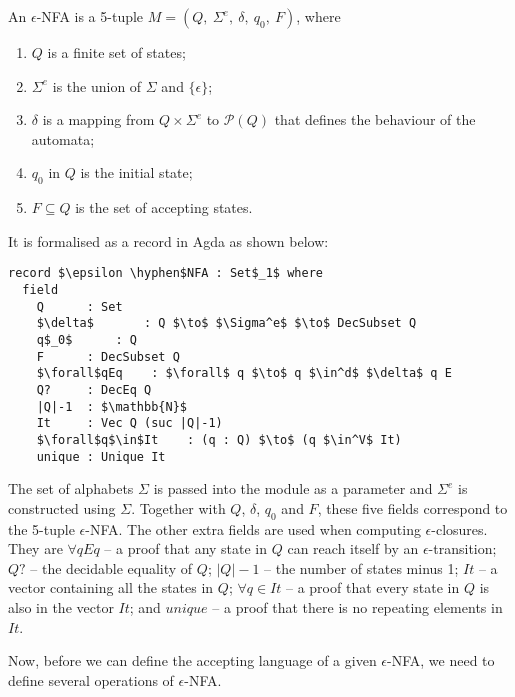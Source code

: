 \begin{defn}
\noindent An \(\epsilon\)-NFA is a 5-tuple \(M = (Q
,\ \Sigma^e,\ \delta,\ q_0,\ F)\), where
\begin{enumerate}[nolistsep]
  \item \(Q\) is a finite set of states;
  \item \(\Sigma^e\) is the union of \(\Sigma\) and \(\{\epsilon\}\);
  \item \(\delta\) is a mapping from \(Q \times \Sigma^e\) to
    \(\mathcal P \left({Q}\right)\) that defines the behaviour of the automata;
  \item \(q_0\) in \(Q\) is the initial state;
  \item \(F \subseteq Q\) is the set of accepting states. 
\end{enumerate}
\end{defn}

\par It is formalised as a record in Agda as shown below: 

\begin{lstlisting}[mathescape=true,xleftmargin=.3\textwidth]
record $\epsilon \hyphen$NFA : Set$_1$ where
  field
    Q      : Set
    $\delta$       : Q $\to$ $\Sigma^e$ $\to$ DecSubset Q
    q$_0$      : Q
    F      : DecSubset Q
    $\forall$qEq    : $\forall$ q $\to$ q $\in^d$ $\delta$ q E
    Q?     : DecEq Q
    |Q|-1  : $\mathbb{N}$
    It     : Vec Q (suc |Q|-1)
    $\forall$q$\in$It    : (q : Q) $\to$ (q $\in^V$ It)
    unique : Unique It
\end{lstlisting}

\par The set of alphabets \(\Sigma\) is passed into the module as a
parameter and \(\Sigma^e\) is constructed using \(\Sigma\). Together with \(Q\), \(\delta\),
\(q_0\) and \(F\), these five fields correspond to the 5-tuple
\(\epsilon\)-NFA. The other extra fields are used when computing
\(\epsilon\)-closures. They are \(\forall qEq\) -- a proof that any
state in \(Q\) can reach itself by an
\(\epsilon\)-transition; \(Q?\) -- the decidable equality of \(Q\);
\(|Q|-1\) -- the number of states minus 1; \(It\) -- a vector
containing all the states in \(Q\); \(\forall q\in It\)
-- a proof that every state in \(Q\) is also in the vector
\(It\); and \(unique\) -- a proof that there is no repeating elements in
\(It\). 

\par Now, before we can define the accepting language of a given
\(\epsilon\)-NFA, we need to define several operations of
\(\epsilon\)-NFA. 

